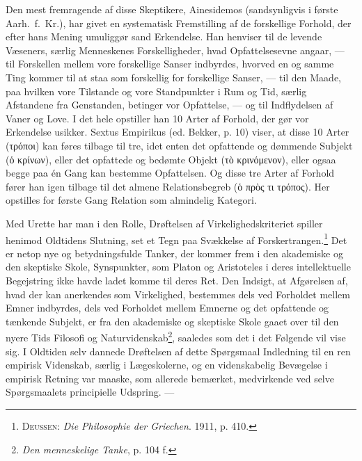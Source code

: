 \documentclass[12pt]{article}
\newcommand{\opage}[1]{\marginnote{\footnotesize\textit{[#1]}}}
\begin{document}
Den mest fremragende af disse Skeptikere, Ainesidemos (sandsynligvis i første
Aarh.\ f.\ Kr.), har givet en systematisk Fremstilling af de forskellige
Forhold, der efter hans Mening umuliggør sand Erkendelse. Han henviser til de
levende Væseners, særlig Menneskenes Forskelligheder, hvad Opfattelsesevne
angaar, --- til Forskellen mellem vore forskellige Sanser indbyrdes, hvorved
\guillemotright en og samme Ting\guillemotleft{}
\opage{9} \setcounter{footnote}{0}
kommer til at staa som forskellig for forskellige Sanser, --- til den Maade,
paa hvilken vore Tilstande og vore Standpunkter i Rum og Tid, særlig
Afstandene fra Genstanden, betinger vor Opfattelse, --- og til Indflydelsen af
Vaner og Love. I det hele opstiller han 10 Arter af Forhold, der gør vor
Erkendelse usikker. Sextus Empirikus (ed. Bekker, p. 10) viser, at disse 10
Arter (τρόποι) kan føres tilbage til tre, idet enten det opfattende og
dømmende Subjekt (ὁ κρίνων), eller det opfattede og bedømte Objekt
(τὸ κρινόμενον), eller ogsaa begge paa én Gang kan bestemme Opfattelsen. Og
disse tre Arter af Forhold fører han igen tilbage til det almene
Relationsbegreb (ὁ πρὸς τι τρόπος). Her opstilles for første Gang Relation som
almindelig Kategori.

Med Urette har man i den Rolle, Drøftelsen af Virkelighedskriteriet spiller
henimod Oldtidens Slutning, set et Tegn paa Svækkelse af
Forskertrangen.\footnote{\textsc{Deussen}: \textit{Die Philosophie der
Griechen}. 1911, p. 410.} Det er netop nye og betydningsfulde Tanker, der
kommer frem i den akademiske og den skeptiske Skole, Synspunkter, som Platon
og Aristoteles i deres intellektuelle Begejstring ikke havde ladet komme til
deres Ret. Den Indsigt, at Afgørelsen af, hvad der kan anerkendes som
Virkelighed, bestemmes dels ved Forholdet mellem Emner indbyrdes, dels ved
Forholdet mellem Emnerne og det opfattende og tænkende Subjekt, er fra den
akademiske og skeptiske Skole gaaet over til den nyere Tids Filosofi og
Naturvidenskab\footnote{\textit{Den menneskelige Tanke}, p. 104 f.}, saaledes
som det i det Følgende vil vise sig. I Oldtiden selv dannede Drøftelsen af
dette Spørgsmaal Indledning til en ren empirisk Videnskab, særlig i
Lægeskolerne, og en videnskabelig Bevægelse i empirisk Retning var maaske, som
allerede
\opage{10} \setcounter{footnote}{0}
bemærket, medvirkende ved selve Spørgsmaalets principielle Udspring. ---
\end{document}
